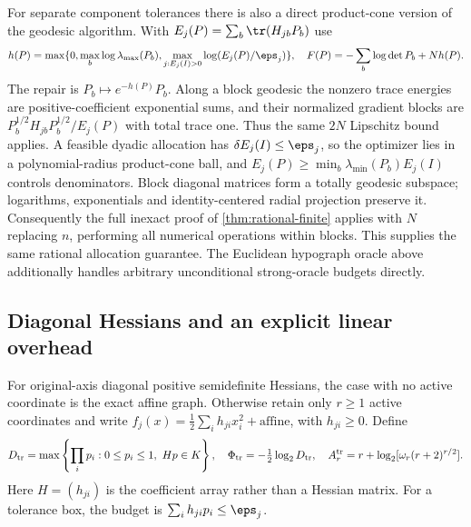 For separate component tolerances there is also a direct product-cone
version of the geodesic algorithm. With
$E_j(P)=\sum_b\tr(H_{jb}P_b)$ use
\[
 h(P)=\max\{0,\max_b\log\lambda_{\max}(P_b),
                    \max_{j:E_j(I)>0}\log(E_j(P)/\eps_j)\},
 \quad F(P)=-\sum_b\log\det P_b+Nh(P).
\]
The repair is $P_b\mapsto e^{-h(P)}P_b$. Along a block geodesic the
nonzero trace energies are positive-coefficient exponential sums, and
their normalized gradient blocks are
$P_b^{1/2}H_{jb}P_b^{1/2}/E_j(P)$ with total trace one. Thus the same
$2N$ Lipschitz bound applies. A feasible dyadic allocation has
$\delta E_j(I)\le\eps_j$, so the optimizer lies in a polynomial-radius
product-cone ball, and
$E_j(P)\ge\min_b\lambda_{\min}(P_b)E_j(I)$ controls denominators.
Block diagonal matrices form a totally geodesic subspace; logarithms,
exponentials and identity-centered radial projection preserve it.
Consequently the full inexact proof of \cref{thm:rational-finite} applies
with $N$ replacing $n$, performing all numerical operations within blocks.
This supplies the same rational allocation guarantee. The Euclidean
hypograph oracle above additionally handles arbitrary unconditional
strong-oracle budgets directly.

\subsection{Diagonal Hessians and an explicit linear overhead}

For original-axis diagonal positive semidefinite Hessians, the case with
no active coordinate is the exact affine graph. Otherwise retain only
$r\ge1$ active coordinates and write
$f_j(x)=\frac12\sum_i h_{ji}x_i^2+\text{affine}$, with $h_{ji}\ge0$.
Define
\[
 D_{\rm tr}=\max\left\{\prod_ip_i:0\le p_i\le1,
                                    \ Hp\in K\right\},
 \quad\Phi_{\rm tr}=-\tfrac12\log_2D_{\rm tr},\quad
 A_r^{\rm tr}=r+\log_2[\omega_r(r+2)^{r/2}].
\]
Here $H=(h_{ji})$ is the coefficient array rather than a Hessian matrix.
For a tolerance box, the budget is $\sum_i h_{ji}p_i\le\eps_j$.

